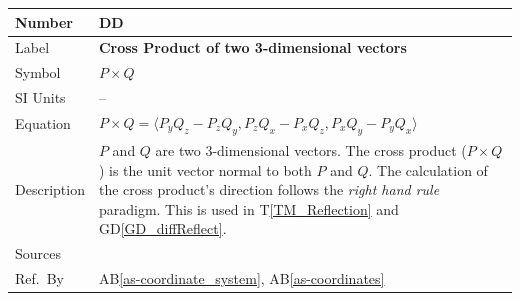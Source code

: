 \documentclass[12pt]{article}
\newcommand{\colAwidth}{0.13\textwidth}
\newcommand{\colBwidth}{0.82\textwidth}
\newcounter{defnum} %
\newcommand{\dref}[1]{GD\ref{#1}}
\newcounter{datadefnum} %
\newcommand{\tref}[1]{T\ref{#1}}
\newcommand{\aBref}[1]{AB\ref{#1}}
\begin{document}
\noindent
\begin{minipage}{\textwidth}
	\renewcommand*{\arraystretch}{1.5}
	\begin{tabular}{| p{\colAwidth} | p{\colBwidth}|}
		\hline
		\rowcolor[gray]{0.9}
		Number& DD{datadefnum}\thedatadefnum 
		\label{DD_Cross_Product}\\
		\hline
		Label& \bf Cross Product of two 3-dimensional vectors\\
		\hline
		Symbol &$P\times Q$\\
		\hline
		SI Units & --\\
		\hline
		Equation&$P\times Q = \langle P_{y}Q_{z}-P_{z}Q_{y}, 
		P_{z}Q_{x}-P_{x}Q_{z}, P_{x}Q_{y}-P_{y}Q_{x} \rangle$ 
		
          \\
		\hline
		Description & $P$ and $Q$ are two $3$-dimensional vectors. The cross 
		product ($P\times Q$) is the unit vector normal to both $P$ and $Q$. 
		The calculation of the cross product's direction follows the 
		\textit{right hand rule} paradigm. This is used in \tref{TM_Reflection} 
		and \dref{GD_diffReflect}.
		\\
		\hline
		Sources& \cite{Lengyel2003}\\
		\hline
		Ref.\ By & \aBref{as-coordinate_system}, \aBref{as-coordinates} \\
		\hline
	\end{tabular}
\end{minipage}\\

~\newline
\end{document}
